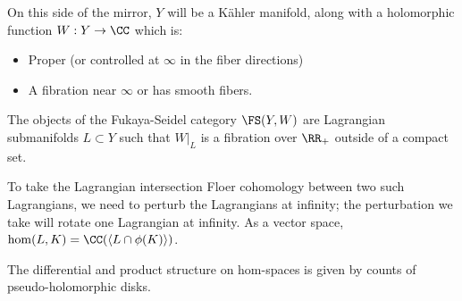 

On this side of the mirror, $Y$ will be a K\"ahler manifold, along with a holomorphic function $W: Y \to \CC$ which is:
\begin{itemize}
    \item Proper (or controlled at $\infty$ in the fiber directions)
    \item A fibration near $\infty$ or has smooth fibers.
\end{itemize}
The objects of the Fukaya-Seidel category $\FS(Y, W)$ are Lagrangian submanifolds $L \subset Y$ such that $W|_L$ is a fibration over $\RR_+$ outside of a compact set. 



To take the Lagrangian intersection Floer cohomology between two such Lagrangians, we need to perturb the Lagrangians at infinity; the perturbation we take will rotate one Lagrangian at infinity. 
As a vector space, $\hom(L, K) = \CC(\langle L \cap \phi(K)\rangle)$.

The differential and product structure on hom-spaces is given by counts of pseudo-holomorphic disks. 




